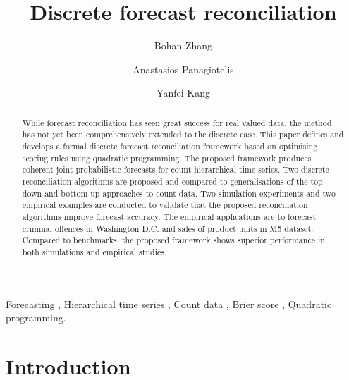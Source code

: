 \documentclass[a4paper,review,12pt,authoryear]{elsarticle}
\theoremstyle{definition}
\begin{document}
\begin{frontmatter}

  \title{Discrete forecast reconciliation}

  \author[label1]{Bohan Zhang}
  \address[label1]{School of Economics and Management, Beihang University, Beijing, China}
  \author[label2]{Anastasios Panagiotelis}

  \author[label1]{Yanfei Kang}
  \address[label2]{The University of Sydney Business School, NSW 2006, Australia}

  \begin{abstract}

    While forecast reconciliation has seen great success for real valued data, the method has not yet been comprehensively extended to the discrete case. This paper defines and develops a formal discrete forecast reconciliation framework based on optimising scoring rules using quadratic programming. The proposed framework produces coherent joint probabilistic forecasts for count hierarchical time series.
    Two discrete reconciliation algorithms are proposed and compared to generalisations of the top-down and bottom-up approaches to count data. Two simulation experiments and two empirical examples are conducted to validate that the proposed reconciliation algorithms improve forecast accuracy. The empirical applications are to forecast criminal offences in Washington D.C. and sales of product units in M5 dataset. Compared to benchmarks, the proposed framework shows superior performance in both simulations and empirical studies.

  \end{abstract}

  \begin{keyword}
  Forecasting \sep
  Hierarchical time series \sep
  Count data \sep
  Brier score \sep
  Quadratic programming.
  \end{keyword}

\end{frontmatter}

\newpage
\linenumbers

\section{Introduction}
\end{document}
